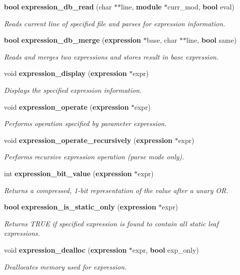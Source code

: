 \begin{CompactItemize}
{\bf bool} {\bf expression\_\-db\_\-read} (char $\ast$$\ast$line, {\bf module} $\ast$curr\_\-mod, {\bf bool} eval)
\begin{CompactList}\small\item\em Reads current line of specified file and parses for expression information.\item\end{CompactList}\item 
{\bf bool} {\bf expression\_\-db\_\-merge} ({\bf expression} $\ast$base, char $\ast$$\ast$line, {\bf bool} same)
\begin{CompactList}\small\item\em Reads and merges two expressions and stores result in base expression.\item\end{CompactList}\item 
void {\bf expression\_\-display} ({\bf expression} $\ast$expr)
\begin{CompactList}\small\item\em Displays the specified expression information.\item\end{CompactList}\item 
void {\bf expression\_\-operate} ({\bf expression} $\ast$expr)
\begin{CompactList}\small\item\em Performs operation specified by parameter expression.\item\end{CompactList}\item 
void {\bf expression\_\-operate\_\-recursively} ({\bf expression} $\ast$expr)
\begin{CompactList}\small\item\em Performs recursive expression operation (parse mode only).\item\end{CompactList}\item 
int {\bf expression\_\-bit\_\-value} ({\bf expression} $\ast$expr)
\begin{CompactList}\small\item\em Returns a compressed, 1-bit representation of the value after a unary OR.\item\end{CompactList}\item 
{\bf bool} {\bf expression\_\-is\_\-static\_\-only} ({\bf expression} $\ast$expr)
\begin{CompactList}\small\item\em Returns TRUE if specified expression is found to contain all static leaf expressions.\item\end{CompactList}\item 
void {\bf expression\_\-dealloc} ({\bf expression} $\ast$expr, {\bf bool} exp\_\-only)
\begin{CompactList}\small\item\em Deallocates memory used for expression.\item\end{CompactList}\end{CompactItemize}
